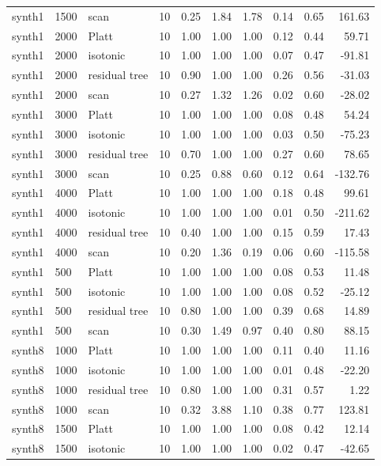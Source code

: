 \begin{tabular}{lllrrrrrrr}
synth1 & 1500 & scan & 10 & 0.25 & 1.84 & 1.78 & 0.14 & 0.65 & 161.63 \\
synth1 & 2000 & Platt & 10 & 1.00 & 1.00 & 1.00 & 0.12 & 0.44 & 59.71 \\
synth1 & 2000 & isotonic & 10 & 1.00 & 1.00 & 1.00 & 0.07 & 0.47 & -91.81 \\
synth1 & 2000 & residual tree & 10 & 0.90 & 1.00 & 1.00 & 0.26 & 0.56 & -31.03 \\
synth1 & 2000 & scan & 10 & 0.27 & 1.32 & 1.26 & 0.02 & 0.60 & -28.02 \\
synth1 & 3000 & Platt & 10 & 1.00 & 1.00 & 1.00 & 0.08 & 0.48 & 54.24 \\
synth1 & 3000 & isotonic & 10 & 1.00 & 1.00 & 1.00 & 0.03 & 0.50 & -75.23 \\
synth1 & 3000 & residual tree & 10 & 0.70 & 1.00 & 1.00 & 0.27 & 0.60 & 78.65 \\
synth1 & 3000 & scan & 10 & 0.25 & 0.88 & 0.60 & 0.12 & 0.64 & -132.76 \\
synth1 & 4000 & Platt & 10 & 1.00 & 1.00 & 1.00 & 0.18 & 0.48 & 99.61 \\
synth1 & 4000 & isotonic & 10 & 1.00 & 1.00 & 1.00 & 0.01 & 0.50 & -211.62 \\
synth1 & 4000 & residual tree & 10 & 0.40 & 1.00 & 1.00 & 0.15 & 0.59 & 17.43 \\
synth1 & 4000 & scan & 10 & 0.20 & 1.36 & 0.19 & 0.06 & 0.60 & -115.58 \\
synth1 & 500 & Platt & 10 & 1.00 & 1.00 & 1.00 & 0.08 & 0.53 & 11.48 \\
synth1 & 500 & isotonic & 10 & 1.00 & 1.00 & 1.00 & 0.08 & 0.52 & -25.12 \\
synth1 & 500 & residual tree & 10 & 0.80 & 1.00 & 1.00 & 0.39 & 0.68 & 14.89 \\
synth1 & 500 & scan & 10 & 0.30 & 1.49 & 0.97 & 0.40 & 0.80 & 88.15 \\
synth8 & 1000 & Platt & 10 & 1.00 & 1.00 & 1.00 & 0.11 & 0.40 & 11.16 \\
synth8 & 1000 & isotonic & 10 & 1.00 & 1.00 & 1.00 & 0.01 & 0.48 & -22.20 \\
synth8 & 1000 & residual tree & 10 & 0.80 & 1.00 & 1.00 & 0.31 & 0.57 & 1.22 \\
synth8 & 1000 & scan & 10 & 0.32 & 3.88 & 1.10 & 0.38 & 0.77 & 123.81 \\
synth8 & 1500 & Platt & 10 & 1.00 & 1.00 & 1.00 & 0.08 & 0.42 & 12.14 \\
synth8 & 1500 & isotonic & 10 & 1.00 & 1.00 & 1.00 & 0.02 & 0.47 & -42.65 \\

\end{tabular}
